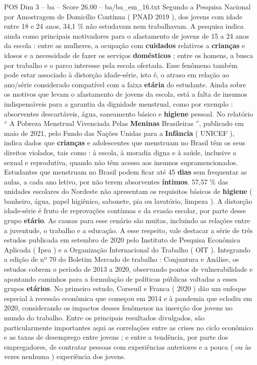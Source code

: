 \begin{textsample}{POS Dim 3 – ba – Score 26.00 – ba/ba\_em\_16.txt}
Segundo a Pesquisa Nacional por Amostragem de Domicílio Contínua ( PNAD 2019 ), dos jovens com idade entre 18 e 24 anos, 34,1 \% não estudavam nem trabalhavam.
A pesquisa indica ainda como principais motivadores para o afastamento de jovens de 15 a 24 anos da escola : entre as mulheres, a ocupação com \textbf{cuidados} relativos a \textbf{crianças} e idosos e a necessidade de fazer os serviços \textbf{domésticos} ; entre os homens, a busca por trabalho e o parco interesse pela escola ofertada.
Esse fenômeno também pode estar associado à distorção idade-série, isto é, o atraso em relação ao ano/série considerado compatível com a faixa \textbf{etária} do estudante.
Ainda sobre os motivos que levam o afastamento de jovens da escola, está a falta de insumos indispensáveis para a garantia da dignidade menstrual, como por exemplo : absorventes descartáveis, água, saneamento básico e \textbf{higiene} pessoal.
No relatório “ A Pobreza Menstrual Vivenciada Pelas \textbf{Meninas} Brasileiras ”, publicado em maio de 2021, pelo Fundo das Nações Unidas para a \textbf{Infância} ( UNICEF ), indica dados que \textbf{crianças} e adolescentes que menstruam no Brasil têm os seus direitos violados, tais como : à escola, à moradia digna e à saúde, inclusive a sexual e reprodutiva, quando não têm acesso aos insumos supramencionados.
Estudantes que menstruam no Brasil podem ficar até 45 \textbf{dias} sem frequentar as aulas, a cada ano letivo, por não terem absorventes \textbf{íntimos}. 57,57 \% das unidades escolares do Nordeste não apresentam os requisitos básicos de \textbf{higiene} ( banheiro, água, papel higiênico, sabonete, pia ou lavatório, limpeza ).
A distorção idade-série é fruto de reprovações contínuas e da evasão escolar, por parte desse grupo \textbf{etário}.
As causas para esse cenário são muitas, incluindo as relações entre a juventude, o trabalho e a educação.
A esse respeito, vale destacar a série de três estudos publicada em setembro de 2020 pelo Instituto de Pesquisa Econômica Aplicada ( Ipea ) e a Organização Internacional do Trabalho ( OIT ).
Integrando a edição de nº 70 do Boletim Mercado de trabalho : Conjuntura e Análise, os estudos cobrem o período de 2013 a 2020, observando pontos de vulnerabilidade e apontando caminhos para a formulação de políticas públicas voltadas a esses grupos \textbf{etários}.
No primeiro estudo, Corseuil e Franca ( 2020 ) dão um enfoque especial à recessão econômica que começou em 2014 e à pandemia que eclodiu em 2020, considerando os impactos desses fenômenos na inserção dos jovens no mundo do trabalho.
Entre os principais resultados divulgados, são particularmente importantes aqui as correlações entre as crises no ciclo econômico e as taxas de desemprego entre jovens ; e entre a tendência, por parte dos empregadores, de contratar pessoas com experiências anteriores e a pouca ( ou às vezes nenhuma ) experiência dos jovens.

\end{textsample}
